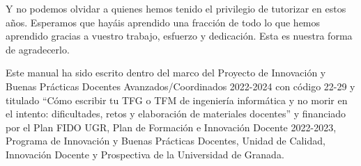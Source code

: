 \documentclass{book}
\begin{document}
Y no podemos olvidar a quienes hemos tenido el privilegio de tutorizar en estos años. Esperamos que hayáis aprendido una fracción de todo lo que hemos aprendido gracias a vuestro trabajo, esfuerzo y dedicación. Esta es nuestra forma de agradecerlo.

Este manual ha sido escrito dentro del marco del Proyecto de Innovación y Buenas Prácticas Docentes Avanzados/Coordinados 2022-2024 con código 22-29 y titulado ``Cómo escribir tu TFG o TFM de ingeniería informática y no morir en el intento: dificultades, retos y elaboración de materiales docentes'' y financiado por el Plan FIDO UGR, Plan de Formación e Innovación Docente 2022-2023, Programa de Innovación y Buenas Prácticas Docentes, Unidad de Calidad, Innovación Docente y Prospectiva de la Universidad de Granada. 



\tableofcontents
\listoftables
\listoffigures

%




















\clearpage
\thispagestyle{empty}
\null
\newpage

\clearpage
\thispagestyle{empty} %
\end{document}

